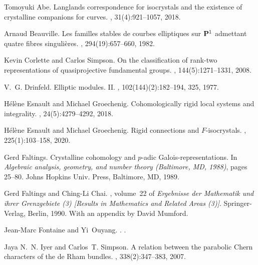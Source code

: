 \documentclass[12pt,twoside]{book}
\theoremstyle{plain}
\theoremstyle{definition}
\theoremstyle{remark}
\numberwithin{equation}{section}
\begin{document}
\begin{thebibliography}{{Ked}07}

Tomoyuki Abe.
\newblock Langlands correspondence for isocrystals and the existence of
  crystalline companions for curves.
, 31(4):921--1057, 2018.

Arnaud Beauville.
\newblock Les familles stables de courbes elliptiques sur {${\bf P}^{1}$}
  admettant quatre fibres singuli\`eres.
, 294(19):657--660,
  1982.

Kevin Corlette and Carlos Simpson.
\newblock On the classification of rank-two representations of quasiprojective
  fundamental groups.
, 144(5):1271--1331, 2008.

V.~G. Drinfeld.
\newblock Elliptic modules. {II}.
, 102(144)(2):182--194, 325, 1977.

H\'{e}l\`ene Esnault and Michael Groechenig.
\newblock Cohomologically rigid local systems and integrality.
, 24(5):4279--4292, 2018.

H\'{e}l\`ene Esnault and Michael Groechenig.
\newblock Rigid connections and {$F$}-isocrystals.
, 225(1):103--158, 2020.

Gerd Faltings.
\newblock Crystalline cohomology and {$p$}-adic {G}alois-representations.
\newblock In {\em Algebraic analysis, geometry, and number theory ({B}altimore,
  {MD}, 1988)}, pages 25--80. Johns Hopkins Univ. Press, Baltimore, MD, 1989.

Gerd Faltings and Ching-Li Chai.
, volume~22 of {\em Ergebnisse
  der Mathematik und ihrer Grenzgebiete (3) [Results in Mathematics and Related
  Areas (3)]}.
\newblock Springer-Verlag, Berlin, 1990.
\newblock With an appendix by David Mumford.

Jean-Marc Fontaine and Yi~Ouyang.
.
.

Jaya N.~N. Iyer and Carlos~T. Simpson.
\newblock A relation between the parabolic {C}hern characters of the de {R}ham
  bundles.
, 338(2):347--383, 2007.


\end{thebibliography}
\end{document}
